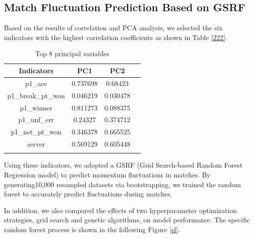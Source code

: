 \documentclass[12pt]{article}%
\begin{document}
\subsection{Match Fluctuation Prediction Based on GSRF}

Based on the results of correlation and PCA analysis, we selected the six indicators with the highest correlation coefficients as shown in Table \ref{222}.
\begin{table}[H]
	\centering
	\caption{Top 8 principal variables}
	\begin{tabular}{cccc}
		
		\hline
		\hline
		\rowcolor{orange!50}
		Indicators          & PC1      & PC2       &                      \\
		\hline
		\cellcolor{yellow!30}
		p1\_ace            & 0.737698 & 0.68423   &                      \\
		\cellcolor{yellow!30}
		p1\_break\_pt\_won & 0.046219 & 0.030478  &                      \\
		\cellcolor{yellow!30}
		p1\_winner         & 0.811273 & 0.088375  &                      \\
		\cellcolor{yellow!30}
		p1\_unf\_err       & 0.24327  & 0.374712  &                      \\
		\cellcolor{yellow!30}
		p1\_net\_pt\_won   & 0.346378 & 0.665525  &                      \\
		\cellcolor{yellow!30}
		server             & 0.569129 & 0.605448  & \multicolumn{1}{l}{} \\
 \hline \hline
		&          &           & \multicolumn{1}{l}{}
		\label{222}
	\end{tabular}
\end{table}




 Using these indicators, we adopted a GSRF (Grid Search-based Random Forest Regression model) to predict momentum fluctuations in matches. By generating10,000 resampled datasets via bootstrapping, we trained the random forest to accurately predict fluctuations during matches.
 
 In addition, we also compared the effects of two hyperparameter optimization strategies, grid search and genetic algorithms, on model performance. The specific random forest process is shown in the following Figure \ref{sl}.
\end{document}

